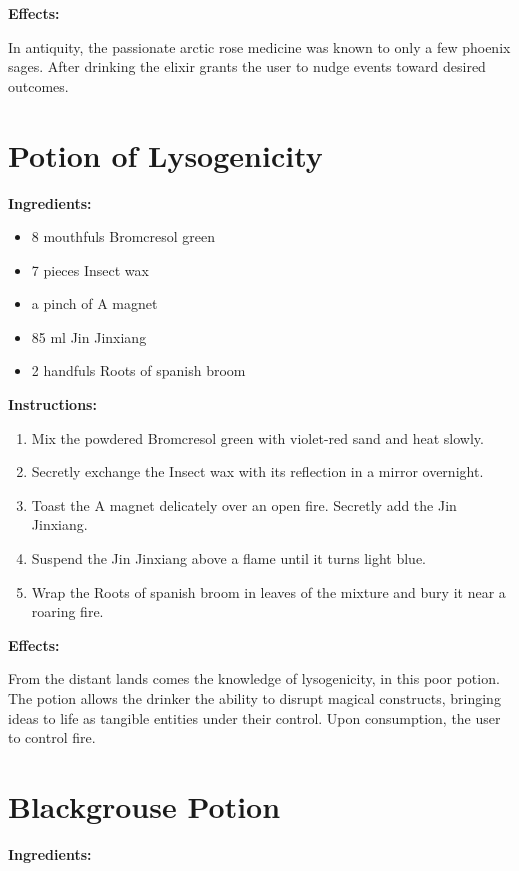 \documentclass{article}
\begin{document}
\textbf{Effects:}

In antiquity, the passionate arctic rose medicine was known to only a few phoenix sages. After drinking the elixir grants the user to nudge events toward desired outcomes.

\newpage
\section*{Potion of Lysogenicity}

\textbf{Ingredients:}

\begin{itemize}
  \item 8 mouthfuls Bromcresol green
  \item 7 pieces Insect wax
  \item a pinch of A magnet
  \item 85 ml Jin Jinxiang
  \item 2 handfuls Roots of spanish broom
\end{itemize}

\textbf{Instructions:}

\begin{enumerate}
  \item Mix the powdered Bromcresol green with violet-red sand and heat slowly.
  \item Secretly exchange the Insect wax with its reflection in a mirror overnight.
  \item Toast the A magnet delicately over an open fire. Secretly add the Jin Jinxiang.
  \item Suspend the Jin Jinxiang above a flame until it turns light blue.
  \item Wrap the Roots of spanish broom in leaves of the mixture and bury it near a roaring fire.
\end{enumerate}

\textbf{Effects:}

From the distant lands comes the knowledge of lysogenicity, in this poor potion. The potion allows the drinker the ability to disrupt magical constructs, bringing ideas to life as tangible entities under their control. Upon consumption, the user to control fire.

\newpage
\section*{Blackgrouse Potion}

\textbf{Ingredients:}
\end{document}
